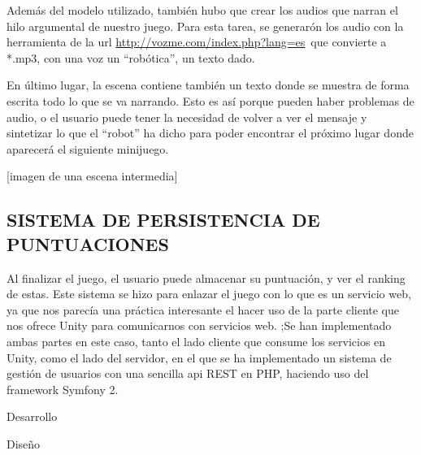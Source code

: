 \documentclass[]{article}
\begin{document}
Además del modelo utilizado, también hubo que crear los audios que
narran el hilo argumental de nuestro juego. Para esta tarea, se
generarón los audio con la herramienta de la url
\href{https://www.google.com/url?q=http://vozme.com/index.php?lang\%3Des\&sa=D\&ust=1464799690122000\&usg=AFQjCNHd3r7Z3_MhdyjbXYSTkEUQQ8dnZg}{http://vozme.com/index.php?lang=es}~que
convierte a *.mp3, con una voz un ``robótica'', un texto dado.

En último lugar, la escena contiene también un texto donde se muestra de
forma escrita todo lo que se va narrando. Esto es así porque pueden
haber problemas de audio, o el usuario puede tener la necesidad de
volver a ver el mensaje y sintetizar lo que el ``robot'' ha dicho para
poder encontrar el próximo lugar donde aparecerá el siguiente minijuego.

{[}imagen de una escena intermedia{]}

\subsection{SISTEMA DE PERSISTENCIA DE
PUNTUACIONES}\label{h.es5w8jt0xlk6}

Al finalizar el juego, el usuario puede almacenar su puntuación, y ver
el ranking de estas. Este sistema se hizo para enlazar el juego con lo
que es un servicio web, ya que nos parecía una práctica interesante el
hacer uso de la parte cliente que nos ofrece Unity para comunicarnos con
servicios web. ;Se han implementado ambas partes en este caso, tanto el
lado cliente que consume los servicios en Unity, como el lado del
servidor, en el que se ha implementado un sistema de gestión de usuarios
con una sencilla api REST en PHP, haciendo uso del framework Symfony 2.

Desarrollo

Diseño
\end{document}
